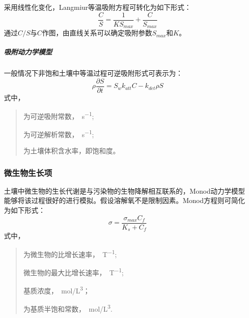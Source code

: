 \documentclass[a4paper,cs4size,adobefonts,fancyhdr]{ctexart}[2005/11/25]
\numberwithin{equation}{section} %
\begin{document}
采用线性化变化，Langmiur等温吸附方程可转化为如下形式：
\begin{equation}
\dfrac{C}{S}=\dfrac{1}{KS_{max}}+\dfrac{C}{S_{max}}
\end{equation}
通过$C/S$与$C$作图，由直线关系可以确定吸附参数$S_{max}$和$K$。
\subparagraph{吸附动力学模型}
一般情况下非饱和土壤中等温过程可逆吸附形式可表示为：
\begin{equation}
\rho\dfrac{\partial S}{\partial t}=S_wk_{att}C-k_{det}\rho S
\end{equation}
式中，
\begin{quote}
	\begin{description}\setlength{\itemsep}{0em}
	\item[$K_{att}$]为可逆吸附常数，\SI{}{s^{-1}};
	\item[$K_{det}$]为可逆解析常数，\SI{}{s^{-1}};
	\item[$S_w$]为土壤体积含水率，即饱和度。
	\end{description}
	\end{quote}\par
\subsubsection{微生物生长项}
土壤中微生物的生长代谢是与污染物的生物降解相互联系的，Monod动力学模型能够将该过程很好的进行模拟。假设溶解氧不是限制因素。Monod方程则可简化为如下形式：
\begin{equation}
\sigma = \dfrac{\sigma_{max}C_f}{K_s+C_f}
\end{equation}
式中，
\begin{quote}
	\begin{description}\setlength{\itemsep}{0em}
	\item[$\sigma$]为微生物的比增长速率，\SI{}{T^{-1}};
	\item[$\sigma_{max}$]微生物的最大比增长速率，\SI{}{T^{-1}};
	\item[$C_f$]基质浓度，\SI{}{mol/L^3}；
	\item[$K_s$]为基质半饱和常数，\SI{}{mol/L^3}.
	\end{description}
	\end{quote}\par
\end{document}

